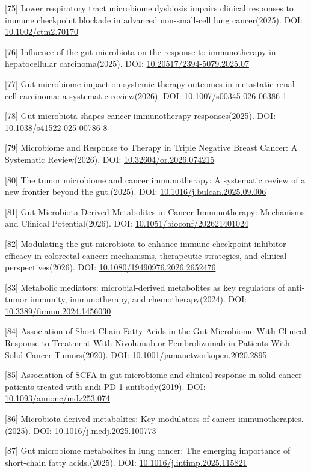 \documentclass[11pt]{article}
\begin{document}
{[}75{]} Lower respiratory tract microbiome dysbiosis impairs clinical responses to immune checkpoint blockade in advanced non-small-cell lung cancer(2025). DOI: \url{10.1002/ctm2.70170}

{[}76{]} Influence of the gut microbiota on the response to immunotherapy in hepatocellular carcinoma(2025). DOI: \url{10.20517/2394-5079.2025.07}

{[}77{]} Gut microbiome impact on systemic therapy outcomes in metastatic renal cell carcinoma: a systematic review(2026). DOI: \url{10.1007/s00345-026-06386-1}

{[}78{]} Gut microbiota shapes cancer immunotherapy responses(2025). DOI: \url{10.1038/s41522-025-00786-8}

{[}79{]} Microbiome and Response to Therapy in Triple Negative Breast Cancer: A Systematic Review(2026). DOI: \url{10.32604/or.2026.074215}

{[}80{]} The tumor microbiome and cancer immunotherapy: A systematic review of a new frontier beyond the gut.(2025). DOI: \url{10.1016/j.bulcan.2025.09.006}

{[}81{]} Gut Microbiota-Derived Metabolites in Cancer Immunotherapy: Mechanisms and Clinical Potential(2026). DOI: \url{10.1051/bioconf/202621401024}

{[}82{]} Modulating the gut microbiota to enhance immune checkpoint inhibitor efficacy in colorectal cancer: mechanisms, therapeutic strategies, and clinical perspectives(2026). DOI: \url{10.1080/19490976.2026.2652476}

{[}83{]} Metabolic mediators: microbial-derived metabolites as key regulators of anti-tumor immunity, immunotherapy, and chemotherapy(2024). DOI: \url{10.3389/fimmu.2024.1456030}

{[}84{]} Association of Short-Chain Fatty Acids in the Gut Microbiome With Clinical Response to Treatment With Nivolumab or Pembrolizumab in Patients With Solid Cancer Tumors(2020). DOI: \url{10.1001/jamanetworkopen.2020.2895}

{[}85{]} Association of SCFA in gut microbiome and clinical response in solid cancer patients treated with andi-PD-1 antibody(2019). DOI: \url{10.1093/annonc/mdz253.074}

{[}86{]} Microbiota-derived metabolites: Key modulators of cancer immunotherapies.(2025). DOI: \url{10.1016/j.medj.2025.100773}

{[}87{]} Gut microbiome metabolites in lung cancer: The emerging importance of short-chain fatty acids.(2025). DOI: \url{10.1016/j.intimp.2025.115821}
\end{document}
